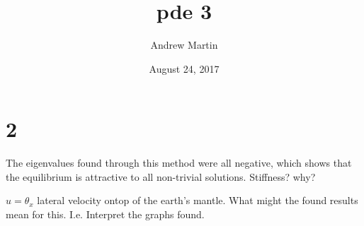 \documentclass[a4paper]{article}
\begin{document}
	\title{pde 3}
	\date{August 24, 2017}
	\author{Andrew Martin}
	\maketitle
	
	\section{2}
	The eigenvalues found through this method were all negative, which shows that the equilibrium is attractive to all non-trivial solutions.
	Stiffness? why?
	
	
	$u =\theta_x$ lateral velocity ontop of the earth's mantle.
	What might the found results mean for this.
	I.e. Interpret the graphs found. 
	
\end{document}
